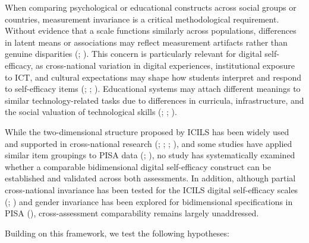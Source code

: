 \documentclass[
  letterpaper,
  DIV=11,
  numbers=noendperiod]{scrartcl}
\begin{document}
When comparing psychological or educational constructs across social
groups or countries, measurement invariance is a critical methodological
requirement. Without evidence that a scale functions similarly across
populations, differences in latent means or associations may reflect
measurement artifacts rather than genuine disparities
(;
). This
concern is particularly relevant for digital self-efficacy, as
cross-national variation in digital experiences, institutional exposure
to ICT, and cultural expectations may shape how students interpret and
respond to self-efficacy items
(;
;
). Educational
systems may attach different meanings to similar technology-related
tasks due to differences in curricula, infrastructure, and the social
valuation of technological skills
(;
;
).

While the two-dimensional structure proposed by ICILS has been widely
used and supported in cross-national research
(;
;
;
), and some
studies have applied similar item groupings to PISA data
(;
),
no study has systematically examined whether a comparable bidimensional
digital self-efficacy construct can be established and validated across
both assessments. In addition, although partial cross-national
invariance has been tested for the ICILS digital self-efficacy scales
(;
) and gender
invariance has been explored for bidimensional specifications in PISA
(),
cross-assessment comparability remains largely unaddressed.

Building on this framework, we test the following hypotheses:
\end{document}
